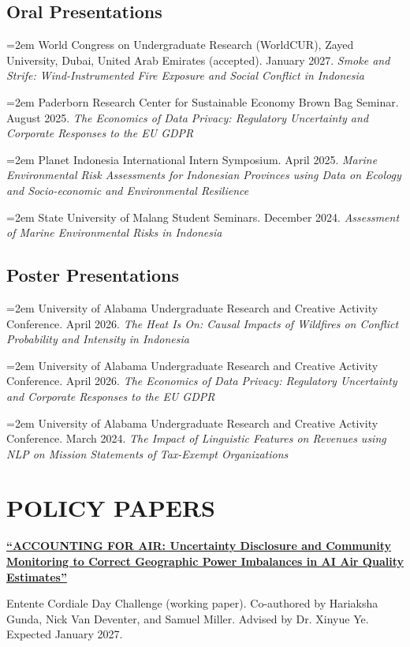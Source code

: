 \documentclass[a4paper,9pt]{extarticle}
\newenvironment{subs} %
  {\adjustwidth{2em}{0pt}}
  {\endadjustwidth}
\newcommand{\presitem}[3]{%
\noindent\hangindent=2em\hangafter=1
  #1. #2. \textit{#3}\par\vspace{4pt}%
}
\begin{document}
\subsection*{Oral Presentations}
\presitem{World Congress on Undergraduate Research (WorldCUR), Zayed University, Dubai, United Arab Emirates (accepted)}{January 2027}{Smoke and Strife: Wind-Instrumented Fire Exposure and Social Conflict in Indonesia}
\presitem{Paderborn Research Center for Sustainable Economy Brown Bag Seminar}{August 2025}{The Economics of Data Privacy: Regulatory Uncertainty and Corporate Responses to the EU GDPR}
\presitem{Planet Indonesia International Intern Symposium}{April 2025}{Marine Environmental Risk Assessments for Indonesian Provinces using Data on Ecology and Socio-economic and Environmental Resilience}
\presitem{State University of Malang Student Seminars}{December 2024}{Assessment of Marine Environmental Risks in Indonesia}

\subsection*{Poster Presentations}

\presitem{University of Alabama Undergraduate Research and Creative Activity Conference}{April 2026}{The Heat Is On: Causal Impacts of Wildfires on Conflict Probability and Intensity in Indonesia}

\presitem{University of Alabama Undergraduate Research and Creative Activity Conference}{April 2026}{The Economics of Data Privacy: Regulatory Uncertainty and Corporate Responses to the EU GDPR}

\presitem{University of Alabama Undergraduate Research and Creative Activity Conference}{March 2024}{The Impact of Linguistic Features on Revenues using NLP on Mission Statements of Tax-Exempt Organizations}

\section*{POLICY PAPERS}

\noindent\textbf{\href{https://docs.google.com/document/d/1MvLqc7xiwkpuX-fnXd9X_x7DhG6QY0P7/edit?usp=sharing&ouid=100299192314330581449&rtpof=true&sd=true}{``ACCOUNTING FOR AIR: Uncertainty Disclosure and Community Monitoring to Correct Geographic Power Imbalances in AI Air Quality Estimates''}}\par\vspace{2pt}
\begin{subs}
\noindent Entente Cordiale Day Challenge (working paper). Co-authored by Hariaksha Gunda, Nick Van Deventer, and Samuel Miller. Advised by Dr. Xinyue Ye. Expected January 2027.\par
\end{subs}
\end{document}
